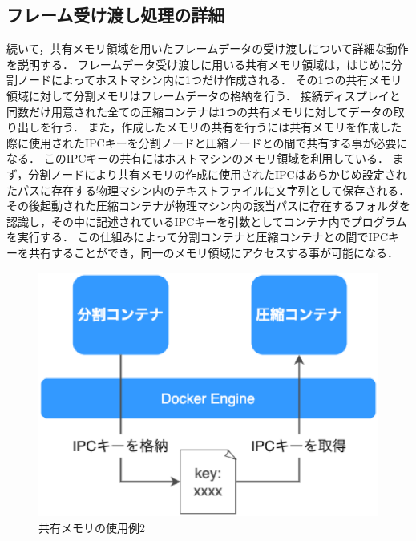 \subsection*{フレーム受け渡し処理の詳細}

続いて，共有メモリ領域を用いたフレームデータの受け渡しについて詳細な動作を説明する．
フレームデータ受け渡しに用いる共有メモリ領域は，はじめに分割ノードによってホストマシン内に1つだけ作成される．
その1つの共有メモリ領域に対して分割メモリはフレームデータの格納を行う．
接続ディスプレイと同数だけ用意された全ての圧縮コンテナは1つの共有メモリに対してデータの取り出しを行う．
また，作成したメモリの共有を行うには共有メモリを作成した際に使用されたIPCキーを分割ノードと圧縮ノードとの間で共有する事が必要になる．
このIPCキーの共有にはホストマシンのメモリ領域を利用している．
まず，分割ノードにより共有メモリの作成に使用されたIPCはあらかじめ設定されたパスに存在する物理マシン内のテキストファイルに文字列として保存される．
その後起動された圧縮コンテナが物理マシン内の該当パスに存在するフォルダを認識し，その中に記述されているIPCキーを引数としてコンテナ内でプログラムを実行する．
この仕組みによって分割コンテナと圧縮コンテナとの間でIPCキーを共有することができ，同一のメモリ領域にアクセスする事が可能になる．

\begin{figure}[H]
    \hspace*{\fill}
    \includegraphics[width=\linewidth]{./fig/chap3/ipckeyshare.eps}
    \hspace*{\fill}
    \caption{共有メモリの使用例2}
\end{figure}

